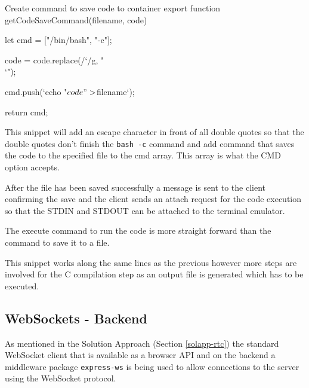 \begin{sexylisting}{Create command to save code to container}
export function getCodeSaveCommand(filename, code) {
    let cmd = ["/bin/bash", "-c"];

    code = code.replace(/`/g, "\\`");

    cmd.push(`echo "${code}" > ${filename}`);

    return cmd;
}
\end{sexylisting}

This snippet will add an escape character in front of all double quotes so that the double quotes don't finish the \texttt{bash -c} command and add command that saves the code to the specified file to the cmd array. This array is what the CMD option accepts. 

After the file has been saved successfully a message is sent to the client confirming the save and the client sends an attach request for the code execution so that the STDIN and STDOUT can be attached to the terminal emulator.

The execute command to run the code is more straight forward than the command to save it to a file.


This snippet works along the same lines as the previous however more steps are involved for the C compilation step as an output file is generated which has to be executed.

\subsection{WebSockets - Backend} \label{impl-ws-backend}

As mentioned in the Solution Approach (Section \ref{solapp-rtc}) the standard WebSocket client that is available as a browser API and on the backend a middleware package \texttt{express-ws} \cite{expressws} is being used to allow connections to the server using the WebSocket protocol.

